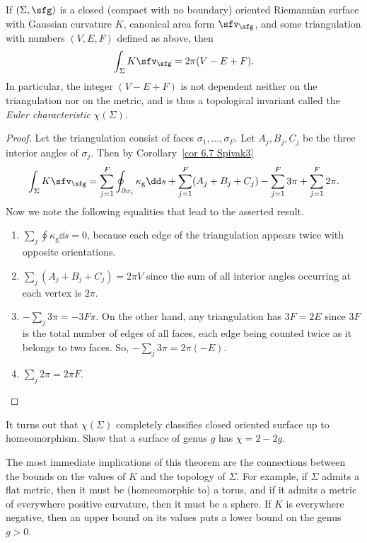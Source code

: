 \begin{thm}\label{thm gauss-bonnet}
    If $(\Sigma,\sfg)$ is a closed (compact with no boundary) oriented Riemannian surface with Gaussian curvature $K$, canonical area form $\sfv_\sfg$, and some triangulation with numbers $(V,E,F)$ defined as above, then 
    \[\int_\Sigma K\sfv_\sfg=2\pi (V-E+F).\]
    In particular, the integer $(V-E+F)$ is not dependent neither on the triangulation nor on the metric, and is thus a topological invariant called the \emph{Euler characteristic} $\chi(\Sigma)$. 
\end{thm}
\begin{proof}
    Let the triangulation consist of faces $\sigma_1,\ldots,\sigma_F$. Let $A_j,B_j,C_j$ be the three interior angles of $\sigma_j$. Then by Corollary~\ref{cor 6.7 Spivak3}
    \[\int_\Sigma K\sfv_\sfg=\sum_{j=1}^F \oint_{\partial \sigma_i}\kappa_{\mathrm{g}}\dd s+\sum_{j=1}^F(A_j+B_j+C_j)-\sum_{j=1}^F 3\pi +\sum_{j=1}^F 2\pi.\]
    Now we note the following equalities that lead to the asserted result.
    \begin{enumerate}[label=(\arabic*)]
        \item $\sum_j \oint \kappa_{\mathrm{g}}\dd s=0$, because each edge of the triangulation appears twice with opposite orientations.
        \item $\sum_j (A_j+B_j+C_j)=2\pi V$ since the sum of all interior angles occurring at each vertex is $2\pi$.
        \item $-\sum_j 3\pi=-3F\pi$. On the other hand, any triangulation has $3F=2E$ since $3F$ is the total number of edges of all faces, each edge being counted twice as it belongs to two faces. So, $-\sum_j 3\pi =2\pi (-E)$.
        \item $\sum_j 2\pi=2\pi F$.
    \end{enumerate}
\end{proof}

\begin{xca}
    It turns out that $\chi(\Sigma)$ completely classifies closed oriented surface up to homeomorphism. Show that a surface of genus $g$ has $\chi=2-2g$.
\end{xca}

The most immediate implications of this theorem are the connections between the bounds on the values of $K$ and the topology of $\Sigma$. For example, if $\Sigma$ admits a flat metric, then it must be (homeomorphic to) a torus, and if it admits a metric of everywhere positive curvature, then it must be a sphere. If $K$ is everywhere negative, then an upper bound on its values puts a lower bound on the genus $g>0$.

